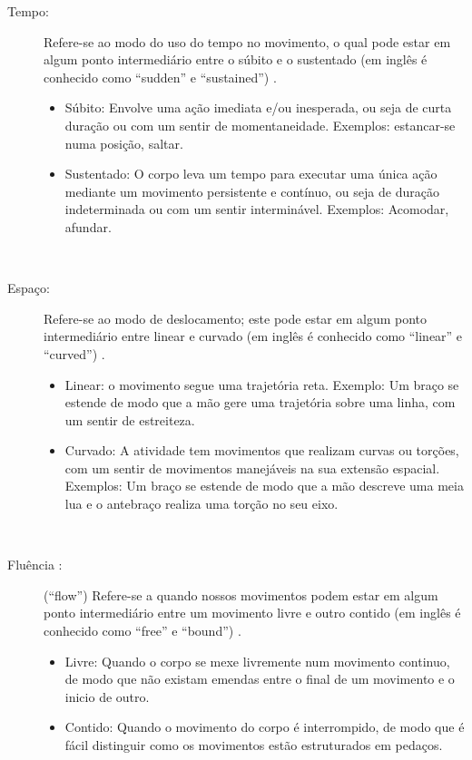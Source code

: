 \begin{description}
\item[Tempo:] Refere-se ao modo do uso do tempo no movimento,
o qual pode estar em algum ponto intermediário entre o súbito e o sustentado 
(em inglês é conhecido como    ``sudden'' e ``sustained'') 
\cite[pp. 143]{laban1987dominio} \cite[pp. 5]{carline2011lesson} \cite[pp. 28]{elementosdanca2017}.
\begin{itemize}
\item Súbito: Envolve uma ação imediata e/ou inesperada, ou seja de curta duração
ou com um sentir de momentaneidade. Exemplos: estancar-se numa posição, saltar.
\item Sustentado: O corpo leva um tempo para executar uma única ação  
mediante um movimento persistente e contínuo, ou seja de duração indeterminada ou com um sentir interminável.  
Exemplos: Acomodar, afundar.
\end{itemize}~
\end{description}

\begin{description}
\item[Espaço:] Refere-se ao modo de deslocamento;
este pode estar em algum ponto intermediário entre  linear  e  curvado 
(em inglês é conhecido como  ``linear'' e ``curved'') 
\cite[pp. 143]{laban1987dominio} \cite[pp. 6]{carline2011lesson} \cite[pp. 28]{elementosdanca2017}.
\begin{itemize}
\item Linear: o movimento segue uma trajetória reta. Exemplo:
Um braço se estende de modo que a mão gere uma trajetória sobre uma linha,
com um sentir de estreiteza.
\item Curvado: A atividade tem movimentos que realizam curvas ou torções,
com um sentir de movimentos manejáveis na sua extensão espacial. 
Exemplos: Um braço se estende de modo que a mão descreve uma meia lua e o antebraço realiza uma torção no seu eixo.
\end{itemize}~
\item[Fluência :] (``flow'') Refere-se a quando nossos movimentos podem 
estar em algum ponto intermediário entre um movimento livre  e outro contido 
(em inglês é conhecido como   ``free'' e ``bound'')
\cite[pp. 140-143]{laban1987dominio} \cite[pp. 6]{carline2011lesson} \cite[pp. 27]{elementosdanca2017}.
\begin{itemize}
\item Livre: Quando o corpo se mexe livremente num movimento continuo,
de modo que não existam emendas entre o final de um movimento e o inicio de outro.
\item Contido: Quando o movimento do corpo é interrompido,
de modo que é fácil distinguir como os movimentos estão estruturados em pedaços.
\end{itemize}~
\end{description}

